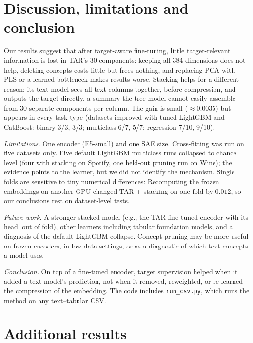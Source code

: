 \documentclass{article}
\begin{document}
\section{Discussion, limitations and conclusion}

Our results suggest that after target-aware fine-tuning, little target-relevant information is lost in TAR's 30
components: keeping all 384 dimensions does not help, deleting concepts costs little but frees nothing, and replacing
PCA with PLS or a learned bottleneck makes results worse. Stacking helps for a different reason: its text model sees
all text columns together, before compression, and outputs the target directly, a summary the tree model cannot
easily assemble from 30 separate components per column. The gain is small ($\approx0.0035$) but appears
in every task type (datasets improved with tuned LightGBM and CatBoost: binary 3/3, 3/3; multiclass 6/7, 5/7;
regression 7/10, 9/10).

\emph{Limitations.} One encoder (E5-small) and one SAE size. Cross-fitting was run on five datasets only. Five default LightGBM multiclass
runs collapsed to chance level (four with stacking on Spotify, one held-out pruning run on Wine); the evidence points
to the learner, but we did not identify the mechanism. Single folds are sensitive to tiny numerical differences:
Recomputing the frozen embeddings on another GPU changed TAR + stacking on one fold by $0.012$, so our conclusions
rest on dataset-level tests.


\emph{Future work.} A stronger stacked model (e.g., the TAR-fine-tuned encoder with its head, out of fold),
other learners including tabular foundation models, and a diagnosis of the default-LightGBM collapse. Concept pruning
may be more useful on frozen encoders, in low-data settings, or as a diagnostic of which text concepts a model uses.


\emph{Conclusion.} On top of a fine-tuned encoder, target supervision helped when it added a text model's prediction,
not when it removed, reweighted, or re-learned the compression of the embedding. The code includes
\texttt{run\_csv.py}, which runs the method on any text--tabular CSV.




\small



\normalsize
\appendix
\section{Additional results}\label{app:main}
\end{document}
